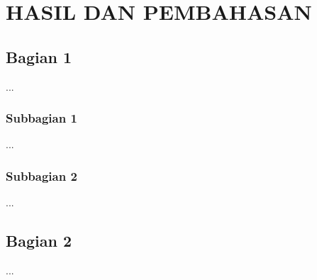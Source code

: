 \renewcommand{\thechapter}{\Roman{chapter}}
\chapter{HASIL DAN PEMBAHASAN}
\renewcommand{\thechapter}{\arabic{chapter}}

\section{Bagian 1}

...


\subsection{Subbagian 1}

...


\subsection{Subbagian 2}

...


\section{Bagian 2}

...



